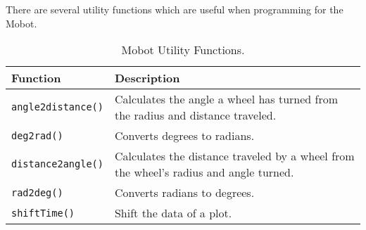 \noindent
There are several utility functions which are useful when programming for
the Mobot. 

\begin{table}[!h]
\begin{center}
\caption{Mobot Utility Functions.}
\begin{tabular}{p{38 mm}p{110 mm}}
\hline
Function & Description \\
\hline
\texttt{angle2distance()} & Calculates the angle a wheel has turned from the
radius and distance traveled.\\
\texttt{deg2rad()} & Converts degrees to radians. \\
\texttt{distance2angle()} & Calculates the distance traveled by a wheel from the wheel's radius and angle turned.\\
\texttt{rad2deg()} & Converts radians to degrees.\\
\texttt{shiftTime()} & Shift the data of a plot.\\
\hline
\end{tabular}
\end{center}
\label{mobilec_api_cbinary}
\end{table}

\clearpage
\newpage





